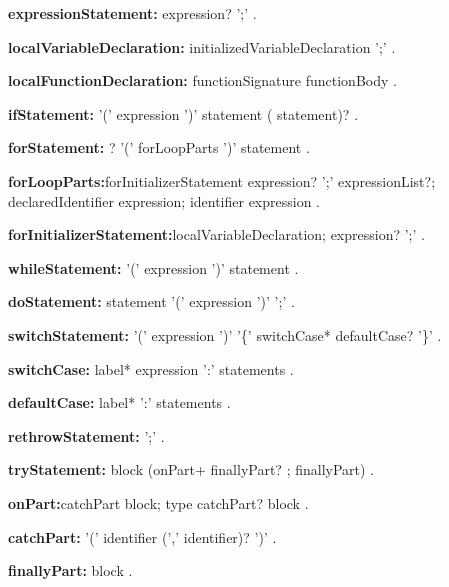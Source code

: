 \begin{grammar}
{\bf expressionStatement:}
  expression? ';'
  .
 \end{grammar}
\begin{grammar}
{\bf localVariableDeclaration:}
    initializedVariableDeclaration ';'
  .
 \end{grammar}
\begin{grammar}
{\bf localFunctionDeclaration:}
    functionSignature functionBody
  .
 \end{grammar}
\begin{grammar}
{\bf ifStatement:}
      \IF{} '(' expression ')' statement ( \ELSE{} statement)? %
    .
 \end{grammar}
\begin{grammar}
{\bf forStatement:}
     \AWAIT? \FOR{} '(' forLoopParts ')' statement
    .

{\bf forLoopParts:}forInitializerStatement expression? ';' expressionList?;
      declaredIdentifier \IN{} expression;
      identifier \IN{} expression
    .

{\bf forInitializerStatement:}localVariableDeclaration;
      expression? ';'
    .
 \end{grammar}
\begin{grammar}
{\bf whileStatement:}
      \WHILE{} '(' expression ')' statement  %
.
 \end{grammar}
\begin{grammar}
{\bf doStatement:}
    \DO{} statement \WHILE{} '(' expression ')' ';'%
      .
 \end{grammar}
\begin{grammar}
{\bf switchStatement:}
      \SWITCH{} '(' expression ')' '\{' switchCase* defaultCase? '\}'%
    .


{\bf switchCase:}
      label* \CASE{} expression ':' statements
    .

{\bf defaultCase:}
      label*  \DEFAULT{} ':' statements
    .
 \end{grammar}
\begin{grammar}
{\bf rethrowStatement:}
     \RETHROW{}  ';'
    .
 \end{grammar}
\begin{grammar}
{\bf tryStatement:}
      \TRY{} block (onPart+ finallyPart? ; finallyPart)
    .
    
 {\bf onPart:}catchPart block;
    \ON{} type catchPart? block
   .

{\bf catchPart:}
      \CATCH{} '(' identifier (',' identifier)? ')' 
    .

{\bf finallyPart:}
      \FINALLY{} block
    .
 \end{grammar}
